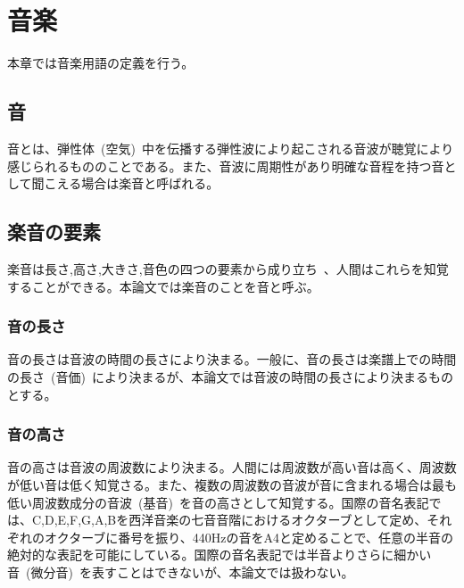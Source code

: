\chapter{音楽}

本章では音楽用語の定義を行う。

\section{音}

音とは、弾性体~(空気)~中を伝播する弾性波により起こされる音波が聴覚により感じられるもののことである。また、音波に周期性があり明確な音程を持つ音として聞こえる場合は楽音と呼ばれる。

\section{楽音の要素}

楽音は長さ,高さ,大きさ,音色の四つの要素から成り立ち~\cite{音楽の基礎}、人間はこれらを知覚することができる。本論文では楽音のことを音と呼ぶ。

\subsection{音の長さ}

音の長さは音波の時間の長さにより決まる。一般に、音の長さは楽譜上での時間の長さ~(音価)~により決まるが、本論文では音波の時間の長さにより決まるものとする。

\subsection{音の高さ}

音の高さは音波の周波数により決まる。人間には周波数が高い音は高く、周波数が低い音は低く知覚さる。また、複数の周波数の音波が音に含まれる場合は最も低い周波数成分の音波~(基音)~を音の高さとして知覚する。国際の音名表記では、C,D,E,F,G,A,Bを西洋音楽の七音音階におけるオクターブとして定め、それぞれのオクターブに番号を振り、440Hzの音をA4と定めることで、任意の半音の絶対的な表記を可能にしている。国際の音名表記では半音よりさらに細かい音~(微分音)~を表すことはできないが、本論文では扱わない。

